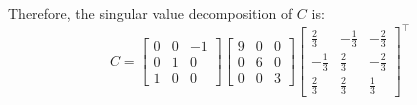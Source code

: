 \begin{homeworkProblem}
\begin{solution}
\begin{itemize}
                Therefore, the singular value decomposition of $C$ is:
                \[
                    C = \begin{bmatrix}
                        0 & 0 & -1 \\
                        0 & 1 & 0 \\
                        1 & 0 & 0
                    \end{bmatrix}
                    \begin{bmatrix}
                        9 & 0 & 0 \\
                        0 & 6 & 0 \\
                        0 & 0 & 3
                    \end{bmatrix}
                    \begin{bmatrix}
                        \frac{2}{3} & -\frac{1}{3} & -\frac{2}{3} \\
                        -\frac{1}{3} & \frac{2}{3} & -\frac{2}{3} \\
                        \frac{2}{3} & \frac{2}{3} & \frac{1}{3}
                    \end{bmatrix}^\top
                \]


\end{itemize}
\end{solution}
\end{homeworkProblem}
